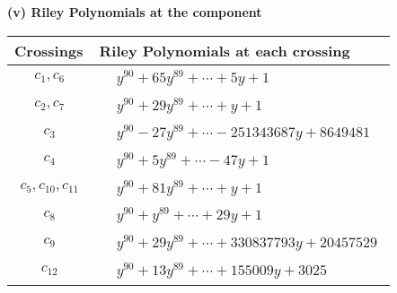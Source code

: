 \documentclass[1p]{elsarticle_modified}
\theoremstyle{definition}
\begin{document}
\newpage\renewcommand{\arraystretch}{1}
\flushleft \textbf{(v) Riley Polynomials at the component}\newline \\
\begin{tabular}{m{50pt}|m{274pt}}
Crossings & \hspace{64pt}Riley Polynomials at each crossing \\
\hline $$\begin{aligned}c_{1},c_{6}\end{aligned}$$&$\begin{aligned}
&y^{90}+65 y^{89}+\cdots+5 y+1
\end{aligned}$\\
\hline $$\begin{aligned}c_{2},c_{7}\end{aligned}$$&$\begin{aligned}
&y^{90}+29 y^{89}+\cdots+y+1
\end{aligned}$\\
\hline $$\begin{aligned}c_{3}\end{aligned}$$&$\begin{aligned}
&y^{90}-27 y^{89}+\cdots-251343687 y+8649481
\end{aligned}$\\
\hline $$\begin{aligned}c_{4}\end{aligned}$$&$\begin{aligned}
&y^{90}+5 y^{89}+\cdots-47 y+1
\end{aligned}$\\
\hline $$\begin{aligned}c_{5},c_{10},c_{11}\end{aligned}$$&$\begin{aligned}
&y^{90}+81 y^{89}+\cdots+y+1
\end{aligned}$\\
\hline $$\begin{aligned}c_{8}\end{aligned}$$&$\begin{aligned}
&y^{90}+y^{89}+\cdots+29 y+1
\end{aligned}$\\
\hline $$\begin{aligned}c_{9}\end{aligned}$$&$\begin{aligned}
&y^{90}+29 y^{89}+\cdots+330837793 y+20457529
\end{aligned}$\\
\hline $$\begin{aligned}c_{12}\end{aligned}$$&$\begin{aligned}
&y^{90}+13 y^{89}+\cdots+155009 y+3025
\end{aligned}$\\
\hline
\end{tabular}\\~\\
\end{document}
